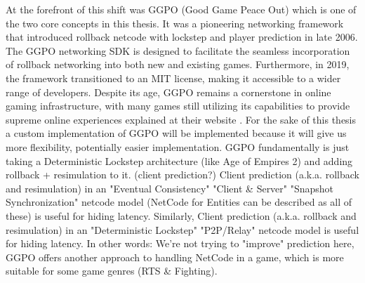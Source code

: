 At the forefront of this shift was GGPO (Good Game Peace Out) which is one of the two core concepts in this thesis. It was a pioneering networking framework that introduced rollback netcode with lockstep and player prediction in late 2006. The GGPO networking SDK is designed to facilitate the seamless incorporation of rollback networking into both new and existing games. Furthermore, in 2019, the framework transitioned to an MIT license, making it accessible to a wider range of developers. Despite its age, GGPO remains a cornerstone in online gaming infrastructure, with many games still utilizing its capabilities to provide supreme online experiences explained at their website \cite{GGPO_page}. For the sake of this thesis a custom implementation of GGPO will be implemented because it will give us more flexibility, potentially easier implementation. GGPO fundamentally is just taking a Deterministic Lockstep architecture (like Age of Empires 2) and adding rollback + resimulation to it. (client prediction?)
Client prediction (a.k.a. rollback and resimulation) in an "Eventual Consistency" "Client & Server" "Snapshot Synchronization" netcode model (NetCode for Entities can be described as all of these) is useful for hiding latency.
Similarly, Client prediction (a.k.a. rollback and resimulation) in an "Deterministic Lockstep" "P2P/Relay" netcode model is useful for hiding latency.
In other words: We're not trying to "improve" prediction here, GGPO offers another approach to handling NetCode in a game, which is more suitable for some game genres (RTS & Fighting).
\newline

